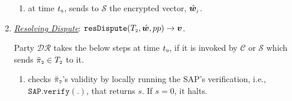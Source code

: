 \begin{enumerate}[leftmargin=.46cm]
\begin{enumerate}
%
%
%
%


\item at time $t_{\scriptscriptstyle 8}$, sends to $\mathcal S$ the encrypted vector, $\hat {\bm w}_{\scriptscriptstyle j}$. %
\end{enumerate}



\item\label{DR::DisputeResolution}  \underline{\textit{Resolving Dispute}}: $\mathtt{resDispute}(T_{\scriptscriptstyle 2}, \hat {\bm w}, pp)\rightarrow \bm v$.

 Party $\mathcal{DR}$ takes the below steps at time $t_{\scriptscriptstyle 9}$, if it is invoked by $\mathcal{C}$ or  $\mathcal{S}$ which sends $\ddot\pi_{\scriptscriptstyle 2}\in T_{\scriptscriptstyle 2}$ to it.

\begin{enumerate}
%
\item checks $\ddot{\pi}_{\scriptscriptstyle 2}$'s validity by locally running  the SAP's verification, i.e., $\mathtt{SAP.verify}(.)$, that  returns  $s$. If $s=0$, it halts. %
%
%
%


\end{enumerate}
\end{enumerate}
